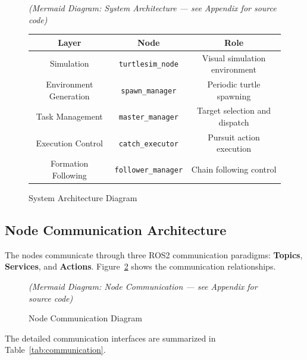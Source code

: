 \documentclass[12pt,a4paper]{article}
\begin{document}
\begin{figure}[H]
  \centering
  \caption{System Architecture Diagram}
  \label{fig:architecture}
  \vspace{0.5em}
  \textit{(Mermaid Diagram: System Architecture --- see Appendix for source code)}
  \vspace{0.5em}

  \begin{tabular}{c|c|c}
    \toprule
    \textbf{Layer} & \textbf{Node} & \textbf{Role} \\
    \midrule
    Simulation & \texttt{turtlesim\_node} & Visual simulation environment \\
    Environment Generation & \texttt{spawn\_manager} & Periodic turtle spawning \\
    Task Management & \texttt{master\_manager} & Target selection and dispatch \\
    Execution Control & \texttt{catch\_executor} & Pursuit action execution \\
    Formation Following & \texttt{follower\_manager} & Chain following control \\
    \bottomrule
  \end{tabular}
\end{figure}

\subsection{Node Communication Architecture}

The nodes communicate through three ROS2 communication paradigms: \textbf{Topics}, \textbf{Services}, and \textbf{Actions}. Figure~\ref{fig:communication} shows the communication relationships.

\begin{figure}[H]
  \centering
  \caption{Node Communication Diagram}
  \label{fig:communication}
  \vspace{0.5em}
  \textit{(Mermaid Diagram: Node Communication --- see Appendix for source code)}
\end{figure}

The detailed communication interfaces are summarized in Table~\ref{tab:communication}.
\end{document}
